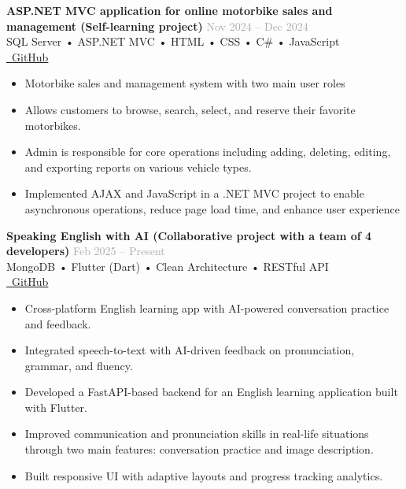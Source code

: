 \documentclass[10pt,a4paper]{article}
\newcommand{\projectitem}[5]{%
    \noindent\begin{tcolorbox}[
        colback=white,
        colframe=lightgray,
        boxrule=0.3pt,
        arc=2pt,
        top=3pt,
        bottom=3pt,
        left=6pt,
        right=6pt
    ]
        \noindent\textbf{\color{primary}#1} \hfill \textcolor{darkgray}{\scriptsize#2}\\[1pt]
        {\small\color{secondary}#3}\\[1pt]
        {\scriptsize\color{darkgray}#4}\\[3pt]
        #5
    \end{tcolorbox}
}
\begin{document}
\projectitem{ASP.NET MVC application for online motorbike sales and management (Self-learning project)}{Nov 2024 -- Dec 2024}
    {SQL Server • ASP.NET MVC • HTML • CSS • C\# • JavaScript}
    {\href{https://github.com/nghuy2903/ASP.Net_MVC_motobikeStore}{\textcolor{secondary}{\faGithub\ GitHub}}}
    {\begin{itemize}[leftmargin=12pt,itemsep=1pt,parsep=0pt,topsep=0pt,after=\vspace{-2pt},label={•}]
        \item Motorbike sales and management system with two main user roles
        \item Allows customers to browse, search, select, and reserve their favorite motorbikes.
        \item Admin is responsible for core operations including adding, deleting, editing, and exporting reports on various vehicle types.
        \item Implemented AJAX and JavaScript in a .NET MVC project to enable asynchronous operations, reduce page load time, and enhance user experience
    \end{itemize}}

\vspace{3pt}

\projectitem{Speaking English with AI (Collaborative project with a team of 4 developers)}{Feb 2025 -- Present}
    {MongoDB • Flutter (Dart) • Clean Architecture • RESTful API}
    {\href{https://github.com/dungken/speaking_english_with_ai_app}{\textcolor{secondary}{\faGithub\ GitHub}}}
    {\begin{itemize}[leftmargin=12pt,itemsep=1pt,parsep=0pt,topsep=0pt,after=\vspace{-2pt},label={•}]
        \item Cross-platform English learning app with AI-powered conversation practice and feedback.
        \item Integrated speech-to-text with AI-driven feedback on pronunciation, grammar, and fluency.
        \item Developed a FastAPI-based backend for an English learning application built with Flutter.
        \item Improved communication and pronunciation skills in real-life situations through two main features: conversation practice and image description.
        \item Built responsive UI with adaptive layouts and progress tracking analytics.
    \end{itemize}}
\end{document}
